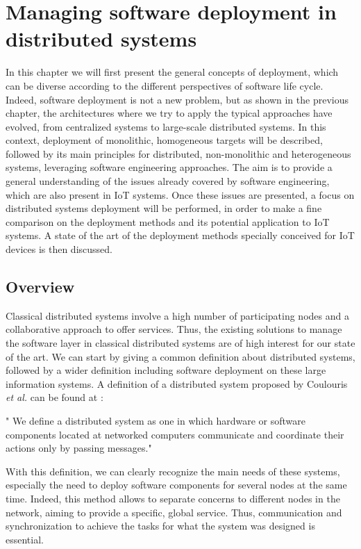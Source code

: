 \chapter{Managing software deployment in distributed systems}
\label{ch:managingDS}
In this chapter we will first present the general concepts of deployment, which can be diverse according to the different perspectives of software life cycle.
Indeed, software deployment is not a new problem, but as shown in the previous chapter, the architectures where we try to apply the typical approaches have evolved, from centralized systems to large-scale distributed systems.
In this context, deployment of monolithic, homogeneous targets will be described, followed by its main principles for distributed, non-monolithic and heterogeneous systems, leveraging software engineering approaches.
The aim is to provide a general understanding of the issues already covered by software engineering, which are also present in IoT systems.
Once these issues are presented, a focus on distributed systems deployment will be performed, in order to make a fine comparison on the deployment methods and its potential application to IoT systems.
A state of the art of the deployment methods specially conceived for IoT devices is then discussed.

\section{Overview}
\label{sec:DSOverview}
Classical distributed systems involve a high number of participating nodes and a collaborative approach to offer services.
Thus, the existing solutions to manage the software layer in classical distributed systems are of high interest for our state of the art.
We can start by giving a common definition about distributed systems, followed by a wider definition including software deployment on these large information systems.
A definition of a distributed system proposed by Coulouris \textit{et al.} can be found at  \cite{coulouris2005distributed}:
\begin{citeverbatim}
	" We define a distributed system as one in which hardware or software components located at networked computers communicate and coordinate their actions only by passing messages."
\end{citeverbatim}

With this definition, we can clearly recognize the main needs of these systems, especially the need to deploy software components for several nodes at the same time.
Indeed, this method allows to separate concerns to different nodes in the network, aiming to provide a specific, global service.
Thus, communication and synchronization to achieve the tasks for what the system was designed is essential.

